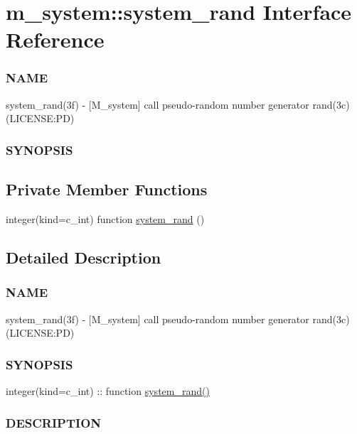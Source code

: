 \hypertarget{interfacem__system_1_1system__rand}{}\section{m\+\_\+system\+:\+:system\+\_\+rand Interface Reference}
\label{interfacem__system_1_1system__rand}


\subsubsection*{N\+A\+ME}

system\+\_\+rand(3f) -\/ \mbox{[}M\+\_\+system\mbox{]} call pseudo-\/random number generator rand(3c) (L\+I\+C\+E\+N\+SE\+:PD) \subsubsection*{S\+Y\+N\+O\+P\+S\+IS} 


\subsection*{Private Member Functions}
\begin{DoxyCompactItemize}
\item 
integer(kind=c\+\_\+int) function \mbox{\hyperlink{interfacem__system_1_1system__rand_a35d3d17489a09dede93091bdc4ab69e0}{system\+\_\+rand}} ()
\end{DoxyCompactItemize}


\subsection{Detailed Description}
\subsubsection*{N\+A\+ME}

system\+\_\+rand(3f) -\/ \mbox{[}M\+\_\+system\mbox{]} call pseudo-\/random number generator rand(3c) (L\+I\+C\+E\+N\+SE\+:PD) \subsubsection*{S\+Y\+N\+O\+P\+S\+IS}

integer(kind=c\+\_\+int) \+:\+: function \mbox{\hyperlink{interfacem__system_1_1system__rand_a35d3d17489a09dede93091bdc4ab69e0}{system\+\_\+rand()}} \subsubsection*{D\+E\+S\+C\+R\+I\+P\+T\+I\+ON}

